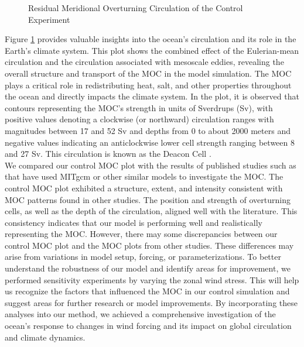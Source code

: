 \documentclass[12pt]{article}
\begin{document}
\begin{figure}
    \begin{center}
    \caption{Residual Meridional Overturning Circulation of the Control Experiment}
    \label{fig:fourthplot}
    \end{center}
\end{figure}

\noindent Figure \ref{fig:fourthplot} provides valuable insights into the ocean's circulation and its role in the Earth's climate system. This plot shows the combined effect of the Eulerian-mean circulation and the circulation associated with mesoscale eddies, revealing the overall structure and transport of the MOC in the model simulation. The MOC plays a critical role in redistributing heat, salt, and other properties throughout the ocean and directly impacts the climate system. In the plot, it is observed that contours representing the MOC's strength in units of Sverdrups (Sv), with positive values denoting a clockwise (or northward) circulation ranges with magnitudes between 17 and 52 Sv and depths from 0 to about 2000 meters and negative values indicating an anticlockwise lower cell strength ranging between 8 and 27 Sv. This circulation is known as the Deacon Cell \citep{farneti2015assessment,doos1994deacon,speer2000diabatic}.\\

\noindent We compared our control MOC plot with the results of published studies such as \citep{farneti2015assessment} that have used MITgcm or other similar models to investigate the MOC. The  control MOC plot exhibited a structure, extent, and intensity consistent with MOC patterns found in other studies. The position and strength of overturning cells, as well as the depth of the circulation, aligned well with the literature. This consistency indicates that our model is performing well and realistically representing the MOC. However, there may some discrepancies between our control MOC plot and the MOC plots from other studies. These differences may arise from variations in model setup, forcing, or parameterizations. To better understand the robustness of our model and identify areas for improvement, we performed sensitivity experiments by varying the zonal wind stress. This will help us recognize the factors that influenced the MOC in our control simulation and suggest areas for further research or model improvements. By incorporating these analyses into our method, we achieved a comprehensive investigation of the ocean's response to changes in wind forcing and its impact on global circulation and climate dynamics.
\end{document}
